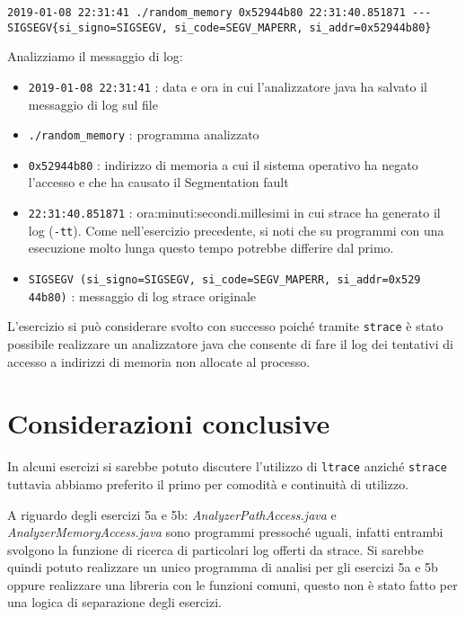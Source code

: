 \documentclass{article}
\newcommand{\filename}[1]{\textit{#1}}
\newcommand{\command}[1]{\texttt{#1}}
\begin{document}
\begin{verbatim}
2019-01-08 22:31:41 ./random_memory 0x52944b80 22:31:40.851871 ---
SIGSEGV{si_signo=SIGSEGV, si_code=SEGV_MAPERR, si_addr=0x52944b80}
\end{verbatim}

Analizziamo il messaggio di log:
\begin{itemize}
    \item \texttt{2019-01-08 22:31:41} : data e ora in cui l'analizzatore java ha salvato il messaggio di log sul file
    \item \texttt{./random_memory} : programma analizzato
    \item \texttt{0x52944b80} : indirizzo di memoria a cui il sistema operativo ha negato l'accesso e che ha causato il Segmentation fault
    \item \texttt{22:31:40.851871} : ora:minuti:secondi.millesimi in cui strace ha generato il log (\command{-tt}). Come nell'esercizio precedente, si noti che su programmi con una esecuzione molto lunga questo tempo potrebbe differire dal primo.
    \item \texttt{SIGSEGV (si_signo=SIGSEGV, si_code=SEGV_MAPERR, si_addr=0x529}
    \texttt{44b80)} : messaggio di log strace originale
\end{itemize}

L'esercizio si può considerare svolto con successo poiché tramite \command{strace} è stato possibile realizzare un analizzatore java che consente di fare il log dei tentativi di accesso a indirizzi di memoria non allocate al processo.

\section{Considerazioni conclusive}

In alcuni esercizi si sarebbe potuto discutere l'utilizzo di \command{ltrace} anziché \command{strace} tuttavia abbiamo preferito il primo per comodità e continuità di utilizzo.

A riguardo degli esercizi 5a e 5b: \filename{AnalyzerPathAccess.java} e \filename{AnalyzerMemoryAccess.java} sono programmi pressoché uguali, infatti entrambi svolgono la funzione di ricerca di particolari log offerti da strace. Si sarebbe quindi potuto realizzare un unico programma di analisi per gli esercizi 5a e 5b oppure realizzare una libreria con le funzioni comuni, questo non è stato fatto per una logica di separazione degli esercizi.


\newpage




\nocite{strace}
\nocite{crawler}
\end{document}
